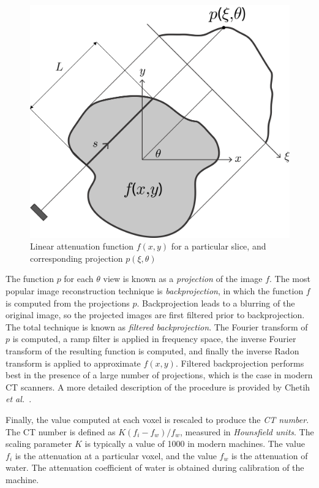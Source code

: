 \begin{figure}[ht]
\centering
		\includegraphics[scale=0.3]{media/0-imaging/ct3.png}
%
\caption{Linear attenuation function $f(x,y)$ for a particular slice, and corresponding projection $p(\xi,\theta)$}
\label{fig:ct3}
\end{figure}

The function $p$ for each $\theta$ view is known as a \textit{projection} of the image $f$. The most popular image reconstruction technique is \textit{backprojection}, in which the function $f$ is computed from the projections $p$. Backprojection leads to a blurring of the original image, so the projected images are first filtered prior to backprojection. The total technique is known as \textit{filtered backprojection}. The Fourier transform of $p$ is computed, a ramp filter is applied in frequency space, the inverse Fourier transform of the resulting function is computed, and finally the inverse Radon transform is applied to approximate $f(x,y)$. Filtered backprojection performs best in the presence of a large number of projections, which is the case in modern CT scanners. A more detailed description of the procedure is provided by Chetih \textit{et al.}~\cite{chetih_2015}.

Finally, the value computed at each voxel is rescaled to produce the \textit{CT number}. The CT number is defined as $K (f_i - f_w)/f_w$, measured in \textit{Hounsfield units}. The scaling parameter $K$ is typically a value of 1000 in modern machines. The value $f_i$ is the attenuation at a particular voxel, and the value $f_w$ is the attenuation of water. The attenuation coefficient of water is obtained during calibration of the machine.

